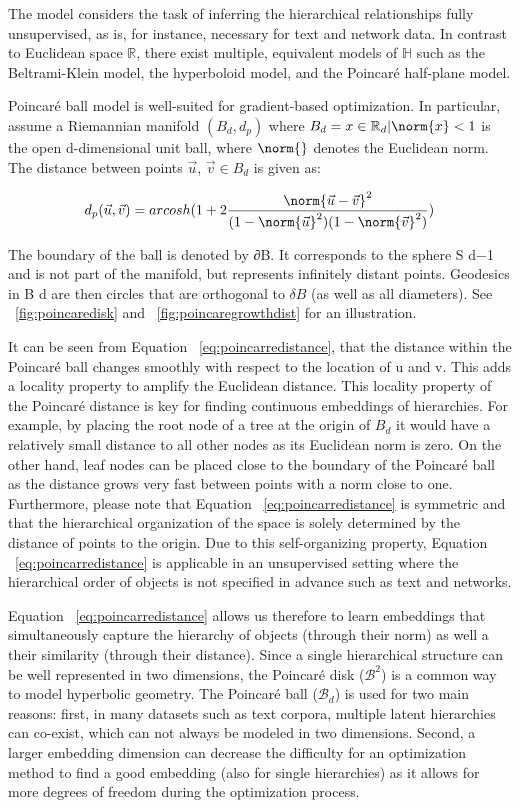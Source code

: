 The model considers the task of inferring the hierarchical relationships fully unsupervised, as is, for instance, necessary for text and network data. In contrast to Euclidean space $ \mathbb{R}$, there exist multiple, equivalent models of $ \mathbb{H}$ such as the Beltrami-Klein model, the hyperboloid model, and the Poincaré half-plane model. 

Poincaré ball model is well-suited for gradient-based optimization. In particular, assume a Riemannian manifold $(B_d , d_p )$ where  $B_d = {x \in \mathbb{R}_d | \norm{x} < 1}$ is the open d-dimensional unit ball, where $\norm{}$ denotes the Euclidean norm. The distance between points $\Vec{u}$, $\Vec{v} \in B_d$ is given as:

\begin{equation} \label{eq:poincarredistance}
    d_p(\Vec{u},\Vec{v})= arcosh(1+2 \dfrac{\norm{\Vec{u}-\Vec{v}}^2}{(1-\norm{\Vec{u}}^2)(1-\norm{\Vec{v}}^2)})
\end{equation}

 The boundary of the ball is denoted by ∂B. It corresponds to the sphere S d−1 and is not part of the manifold, but represents infinitely distant points. Geodesics in B d are then circles that are orthogonal to $\delta B$ (as well as all diameters). See ~\ref{fig:poincaredisk} and ~\ref{fig:poincaregrowthdist} for an illustration.

It can be seen from Equation ~\ref{eq:poincarredistance}, that the distance within the Poincaré ball changes smoothly with
respect to the location of u and v. This adds a locality property to amplify the Euclidean distance. This locality property of the Poincaré distance is key for finding continuous embeddings of hierarchies. For example, by placing the root node of a tree at the origin of $B_d$ it would have a relatively small distance to all other nodes as its Euclidean norm is zero. On the other hand, leaf nodes can be placed close to the boundary of the Poincaré ball as the distance grows very fast between points with a norm close to one. Furthermore, please note that Equation ~\ref{eq:poincarredistance} is symmetric and that the hierarchical organization of the space is solely determined by the distance of points to the origin. Due to this self-organizing property, Equation ~\ref{eq:poincarredistance} is applicable in an unsupervised setting where the hierarchical order of objects is not specified in advance such as text and networks.

Equation ~\ref{eq:poincarredistance} allows us therefore to learn embeddings that simultaneously capture the hierarchy of objects (through their norm) as well a their similarity (through their distance). Since a single hierarchical structure can be well represented in two dimensions, the Poincaré disk ($ \mathcal{B}^2 $) is a common way to model hyperbolic geometry. The Poincaré ball ($ \mathcal{B}_d $) is used for two main reasons: first, in many datasets such as text corpora, multiple latent hierarchies can co-exist, which can not always be modeled in two dimensions. Second, a larger embedding dimension can decrease the difficulty for an optimization method to find a good embedding (also for single hierarchies) as it allows for more degrees of freedom during the optimization process. 

